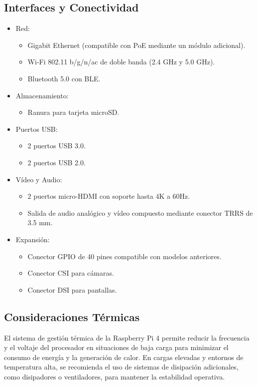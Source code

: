     \subsection{Interfaces y Conectividad}
    \begin{itemize}
        \item Red:
        \begin{itemize}
            \item Gigabit Ethernet (compatible con PoE mediante un módulo adicional).
            \item Wi-Fi 802.11 b/g/n/ac de doble banda (2.4 GHz y 5.0 GHz).
            \item Bluetooth 5.0 con BLE.
        \end{itemize}
        \item Almacenamiento:
        \begin{itemize}
            \item Ranura para tarjeta microSD.
        \end{itemize}
        \item Puertos USB:
        \begin{itemize}
            \item 2 puertos USB 3.0.
            \item 2 puertos USB 2.0.
        \end{itemize}
        \item Vídeo y Audio:
        \begin{itemize}
            \item 2 puertos micro-HDMI con soporte hasta 4K a 60Hz.
            \item Salida de audio analógico y vídeo compuesto mediante conector TRRS de 3.5 mm.
        \end{itemize}
        \item Expansión:
        \begin{itemize}
            \item Conector GPIO de 40 pines compatible con modelos anteriores.
            \item Conector CSI para cámaras.
            \item Conector DSI para pantallas.
        \end{itemize}
    \end{itemize}

    \subsection{Consideraciones Térmicas}
    El sistema de gestión térmica de la Raspberry Pi 4 permite reducir la frecuencia y el voltaje del procesador en situaciones de baja carga para minimizar el consumo de energía y la generación de calor. En cargas elevadas y entornos de temperatura alta, se recomienda el uso de sistemas de disipación adicionales, como disipadores o ventiladores, para mantener la estabilidad operativa.

